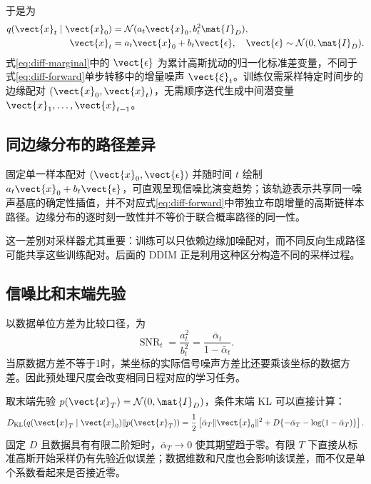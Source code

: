 \documentclass[../textbook.tex]{subfiles}
\begin{document}
于是为
\begin{equation}\label{eq:diff-marginal}
 \begin{aligned}
  q(\vect{x}_t\mid \vect{x}_0)&=\mathcal N(a_t\vect{x}_0,b_t^2\mat{I}_D),\\
  \vect{x}_t&=a_t\vect{x}_0+b_t\vect{\epsilon},\quad\vect{\epsilon}\sim\mathcal N(0,\mat{I}_D).
 \end{aligned}
\end{equation}
式\eqref{eq:diff-marginal}中的 $\vect{\epsilon}$ 为累计高斯扰动的归一化标准差变量，不同于式\eqref{eq:diff-forward}单步转移中的增量噪声 $\vect{\xi}_t$。训练仅需采样特定时间步的边缘配对 $(\vect{x}_0,\vect{x}_t)$，无需顺序迭代生成中间潜变量 $\vect{x}_1,\ldots,\vect{x}_{t-1}$。

\subsection{同边缘分布的路径差异}
固定单一样本配对 $(\vect{x}_0,\vect{\epsilon})$ 并随时间 $t$ 绘制 $a_t\vect{x}_0+b_t\vect{\epsilon}$，可直观呈现信噪比演变趋势；该轨迹表示共享同一噪声基底的确定性插值，并不对应式\eqref{eq:diff-forward}中带独立布朗增量的高斯链样本路径。边缘分布的逐时刻一致性并不等价于联合概率路径的同一性。

这一差别对采样器尤其重要：训练可以只依赖边缘加噪配对，而不同反向生成路径可能共享这些训练配对。后面的 DDIM 正是利用这种区分构造不同的采样过程。

\subsection{信噪比和末端先验}
以数据单位方差为比较口径，为
\begin{equation}
 \operatorname{SNR}_t=\frac{a_t^2}{b_t^2}=\frac{\bar\alpha_t}{1-\bar\alpha_t}.
\end{equation}
当原数据方差不等于1时，某坐标的实际信号噪声方差比还要乘该坐标的数据方差。因此预处理尺度会改变相同日程对应的学习任务。

取末端先验 $p(\vect{x}_T)=\mathcal N(0,\mat{I}_D)$，条件末端 KL 可以直接计算：
\begin{equation}
 D_{\mathrm{KL}}(q(\vect{x}_T\mid \vect{x}_0)\|p(\vect{x}_T))=
 \frac12\left[\bar\alpha_T\|\vect{x}_0\|^2+D\{-\bar\alpha_T-\log(1-\bar\alpha_T)\}\right].
 \label{eq:diff-terminalkl}
\end{equation}
固定 $D$ 且数据具有有限二阶矩时，$\bar\alpha_T\to0$ 使其期望趋于零。有限 $T$ 下直接从标准高斯开始采样仍有先验近似误差；数据维数和尺度也会影响该误差，而不仅是单个系数看起来是否接近零。
\end{document}
